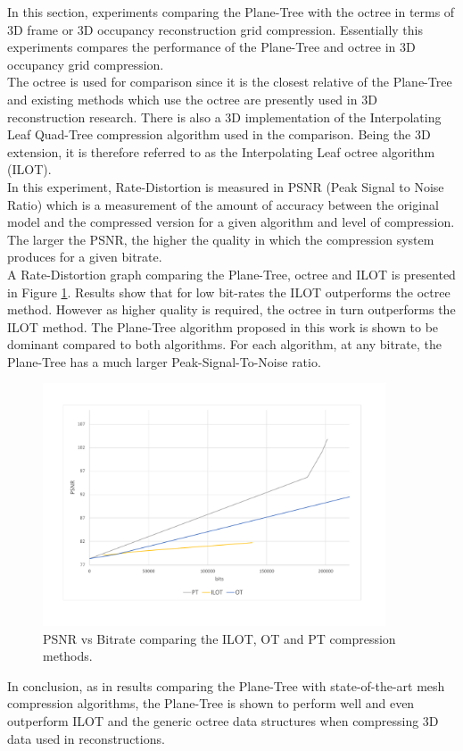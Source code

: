 
In this section, experiments comparing the Plane-Tree with the octree in terms of 3D frame or 3D occupancy reconstruction grid compression. Essentially this experiments compares the performance of the Plane-Tree and octree in 3D occupancy grid compression. \\

The octree is used for comparison since it is the closest relative of the Plane-Tree and existing methods which use the octree are presently used in 3D reconstruction research. There is also a 3D implementation of the Interpolating Leaf Quad-Tree \cite{Lincoln13Interpolating} compression algorithm used in the comparison. Being the 3D extension, it is therefore referred to as the Interpolating Leaf octree algorithm (ILOT). \\

In this experiment, Rate-Distortion is measured in PSNR (Peak Signal to Noise Ratio) which is a measurement of the amount of accuracy between the original model and the compressed version for a given algorithm and level of compression. The larger the PSNR, the higher the quality in which the compression system produces for a given bitrate. \\

A Rate-Distortion graph comparing the Plane-Tree, octree and ILOT is presented in Figure \ref{fig:3DReconCompression1}. Results show that for low bit-rates the ILOT outperforms the octree method. However as higher quality is required, the octree in turn outperforms the ILOT method. The Plane-Tree algorithm proposed in this work is shown to be dominant compared to both algorithms. For each algorithm, at any bitrate, the Plane-Tree has a much larger Peak-Signal-To-Noise ratio. \\

\begin{figure}[!htb]
\centering
\includegraphics[width=4.0in]{images/results/compression/psnr1}
\caption{PSNR vs Bitrate comparing the ILOT, OT and PT compression methods.}
\label{fig:3DReconCompression1}
\end{figure}

In conclusion, as in results comparing the Plane-Tree with state-of-the-art mesh compression algorithms, the Plane-Tree is shown to perform well and even outperform ILOT and the generic octree data structures when compressing 3D data used in reconstructions. 
